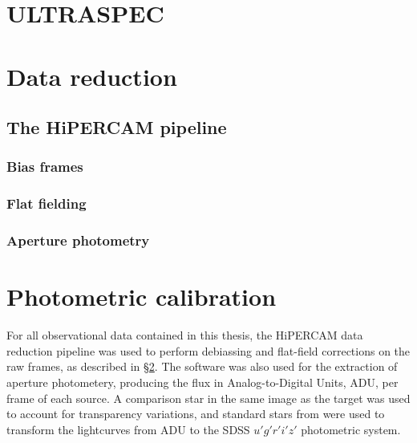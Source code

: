 \section{ULTRASPEC}


\section{Data reduction}
\label{sect:data reduction}

\subsection{The HiPERCAM pipeline}

\subsubsection{Bias frames}

\subsubsection{Flat fielding}

\subsubsection{Aperture photometry}

\section{Photometric calibration}
\label{sect:photometric extraction and calibration}

For all observational data contained in this thesis, the HiPERCAM data reduction pipeline \citep{dhillon2016} was used to perform debiassing and flat-field corrections on the raw frames, as described in \S\ref{sect:data reduction}. The software was also used for the extraction of aperture photometery, producing the flux in Analog-to-Digital Units, ADU, per frame of each source. 
A comparison star in the same image as the target was used to account for transparency variations, and standard stars from \citet{smith2002} were used to transform the lightcurves from ADU to the SDSS $u'g'r'i'z'$ photometric system. 


